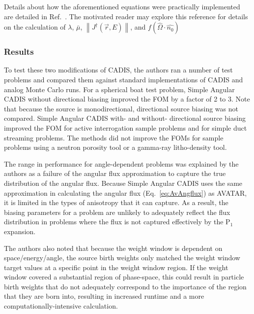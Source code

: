 Details about how the aforementioned equations were practically implemented are
detailed in Ref.\ \cite{peplow_consistent_2012}. The motivated reader may explore this
reference for details on the calculation of $\lambda$, $\bar{\mu}$,
$\left\| J^{\dagger}(\vec{r}, E)\right\|$, and $f(\hat\Omega \cdot \hat{n_0})$

\subsubsection*{Results}

To test these two modifications of CADIS, the authors ran a number of test
problems and
compared them against standard implementations of CADIS and analog Monte Carlo
runs. For a spherical boat test problem, Simple Angular CADIS without
directional biasing improved the FOM by a factor of 2 to 3. Note that because
the source is monodirectional, directional source biasing was not compared.
Simple Angular CADIS with- and without- directional source biasing improved the
FOM for active interrogation sample problems and for simple duct streaming
problems. The methods did not improve the FOMs for sample problems using a neutron
porosity tool or a gamma-ray litho-density tool.

The range in performance for
angle-dependent problems was explained by the authors as a failure of the
angular flux approximation to capture the true distribution of the angular flux.
Because Simple Angular CADIS uses the same approximation in calculating the
angular flux (Eq.\ \eqref{eq:AvAngflux}) as AVATAR, it is limited in the types of anisotropy
that it can capture. As a result, the biasing parameters for a problem are
unlikely to
adequately reflect the flux distribution in problems where the flux is not
captured effectively by the P$_1$ expansion.

The authors also noted that because the weight window is dependent on
space/energy/angle, the source birth weights only matched
the weight window target values at a specific point in the weight window region.
If the weight window covered a substantial region of phase-space, this could
result in particle birth weights that do not adequately correspond to the
importance of the region that they are born into, resulting in increased runtime
and a more computationally-intensive calculation.

